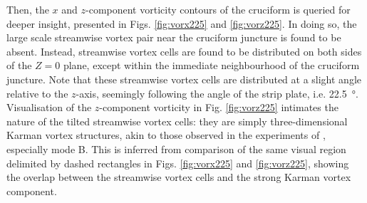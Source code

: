 \documentclass[oneside]{utmthesis}
\begin{document}
Then, the $x$ and $z$-component vorticity contours of the \angtw{} cruciform is queried for deeper insight, presented in Figs. \ref{fig:vorx225} and \ref{fig:vorz225}. In doing so, the large scale streamwise vortex pair near the cruciform juncture is found to be absent. Instead, streamwise vortex cells are found to be distributed on both sides of the $Z = 0$ plane, except within the immediate neighbourhood of the cruciform juncture. Note that these streamwise vortex cells are distributed at a slight angle relative to the $z$-axis, seemingly following the angle of the strip plate, i.e. \SI{22.5}{\degree}. Visualisation of the $z$-component vorticity in Fig. \ref{fig:vorz225} intimates the nature of the tilted streamwise vortex cells: they are simply three-dimensional Karman vortex structures, akin to those observed in the experiments of \citet{Williamson1996a}, especially mode B. This is inferred from comparison of the same visual region delimited by dashed rectangles in Figs. \ref{fig:vorx225} and \ref{fig:vorz225}, showing the overlap between the streamwise vortex cells and the strong Karman vortex component.
\end{document}
